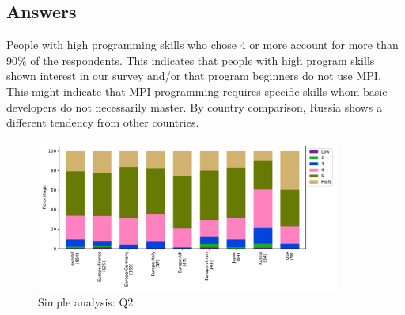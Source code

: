 
\subsection{Answers}


People with high programming skills who chose 4 or more
account for more than 90\% of the respondents.
This indicates that people with high program skills shown interest
in our survey and/or that program beginners do not use MPI. This might
indicate 
that MPI programming requires specific skills whom basic developers do
not necessarily master. 
By country comparison, Russia shows a different tendency from 
other countries.

\begin{figure}[htb]
\begin{center}
\includegraphics[width=10cm]{../pdfs/Q2.pdf}
\caption{Simple analysis: Q2}
\label{fig:Q2}
\end{center}
\end{figure}
